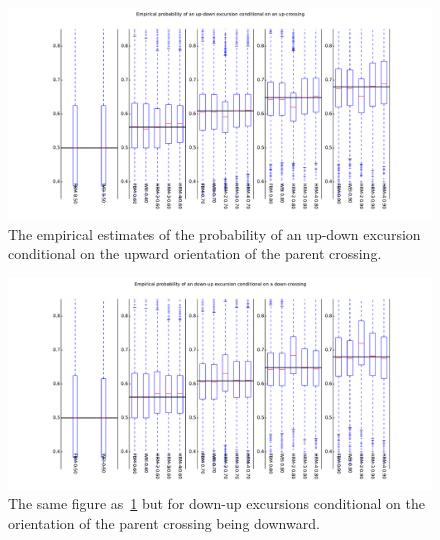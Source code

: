 \documentclass[a4paper]{article}
\begin{document}
\begin{figure}[htb]\begin{center}
    \includegraphics[width=6in]{images/fig_03_up-down_med_10000-17}
    \caption{The empirical estimates of the probability of an up-down excursion conditional on
    the upward orientation of the parent crossing.}
\label{fig:all_offspring_up_down}
\end{center}\end{figure}

\begin{figure}[htb]\begin{center}
    \includegraphics[width=6in]{images/fig_03_down-up_med_10000-17}
    \caption{The same figure as~\ref{fig:all_offspring_up_down} but for down-up excursions
    conditional on the orientation of the parent crossing being downward.}
\label{fig:all_offspring_down_up}
\end{center}\end{figure}
\end{document}

